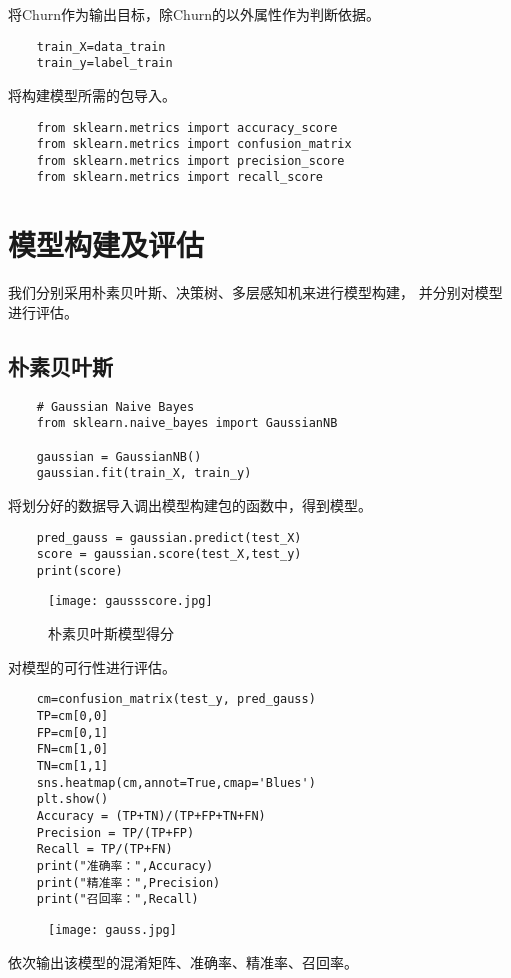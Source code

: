 \documentclass[AutoFakeBold]{LZUThesis}
\begin{document}
将$\mathrm{Churn}$作为输出目标，除$\mathrm{Churn}$的以外属性作为判断依据。
\begin{lstlisting}
    train_X=data_train
    train_y=label_train
\end{lstlisting}

将构建模型所需的包导入。
\begin{lstlisting}
    from sklearn.metrics import accuracy_score
    from sklearn.metrics import confusion_matrix
    from sklearn.metrics import precision_score
    from sklearn.metrics import recall_score
\end{lstlisting}
\section{模型构建及评估}

我们分别采用朴素贝叶斯、决策树、多层感知机来进行模型构建，
并分别对模型进行评估。
\subsection{朴素贝叶斯}
\begin{lstlisting}
    # Gaussian Naive Bayes
    from sklearn.naive_bayes import GaussianNB
    
    gaussian = GaussianNB()
    gaussian.fit(train_X, train_y)
\end{lstlisting}
将划分好的数据导入调出模型构建包的函数中，得到模型。
\begin{lstlisting}
    pred_gauss = gaussian.predict(test_X)
    score = gaussian.score(test_X,test_y)
    print(score)
\end{lstlisting}
\begin{figure}[htbp]
    \centering
    \texttt{[image: gaussscore.jpg]}
    \caption{朴素贝叶斯模型得分}
\end{figure}
对模型的可行性进行评估。
\begin{lstlisting}
    cm=confusion_matrix(test_y, pred_gauss)
    TP=cm[0,0]
    FP=cm[0,1]
    FN=cm[1,0]
    TN=cm[1,1]
    sns.heatmap(cm,annot=True,cmap='Blues')
    plt.show()
    Accuracy = (TP+TN)/(TP+FP+TN+FN)
    Precision = TP/(TP+FP)
    Recall = TP/(TP+FN)
    print("准确率：",Accuracy)
    print("精准率：",Precision)
    print("召回率：",Recall)
\end{lstlisting}
\begin{figure}[htbp]
    \centering
    \texttt{[image: gauss.jpg]}
\end{figure}
依次输出该模型的混淆矩阵、准确率、精准率、召回率。
\end{document}
